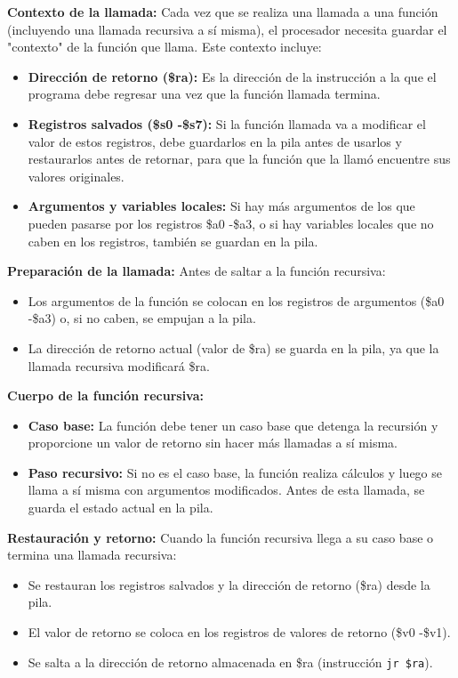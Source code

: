 \documentclass{article}
\begin{document}
\textbf{Contexto de la llamada:} Cada vez que se realiza una llamada a una función (incluyendo una llamada recursiva a sí misma), el procesador necesita guardar el "contexto" de la función que llama. Este contexto incluye:
\begin{itemize}
    \item \textbf{Dirección de retorno (\$ra):} Es la dirección de la instrucción a la que el programa debe regresar una vez que la función llamada termina.
    \item \textbf{Registros salvados (\$s0 -\$s7):} Si la función llamada va a modificar el valor de estos registros, debe guardarlos en la pila antes de usarlos y restaurarlos antes de retornar, para que la función que la llamó encuentre sus valores originales.
    \item \textbf{Argumentos y variables locales:} Si hay más argumentos de los que pueden pasarse por los registros \$a0 -\$a3, o si hay variables locales que no caben en los registros, también se guardan en la pila.
\end{itemize}

\textbf{Preparación de la llamada:} Antes de saltar a la función recursiva:
\begin{itemize}
    \item Los argumentos de la función se colocan en los registros de argumentos (\$a0 -\$a3) o, si no caben, se empujan a la pila.
    \item La dirección de retorno actual (valor de \$ra) se guarda en la pila, ya que la llamada recursiva modificará \$ra.
\end{itemize}

\textbf{Cuerpo de la función recursiva:}
\begin{itemize}
    \item \textbf{Caso base:} La función debe tener un caso base que detenga la recursión y proporcione un valor de retorno sin hacer más llamadas a sí misma.
    \item \textbf{Paso recursivo:} Si no es el caso base, la función realiza cálculos y luego se llama a sí misma con argumentos modificados. Antes de esta llamada, se guarda el estado actual en la pila.
\end{itemize}

\textbf{Restauración y retorno:} Cuando la función recursiva llega a su caso base o termina una llamada recursiva:
\begin{itemize}
    \item Se restauran los registros salvados y la dirección de retorno (\$ra) desde la pila.
    \item El valor de retorno se coloca en los registros de valores de retorno (\$v0 -\$v1).
    \item Se salta a la dirección de retorno almacenada en \$ra (instrucción \texttt{jr \$ra}).
\end{itemize}
\end{document}
